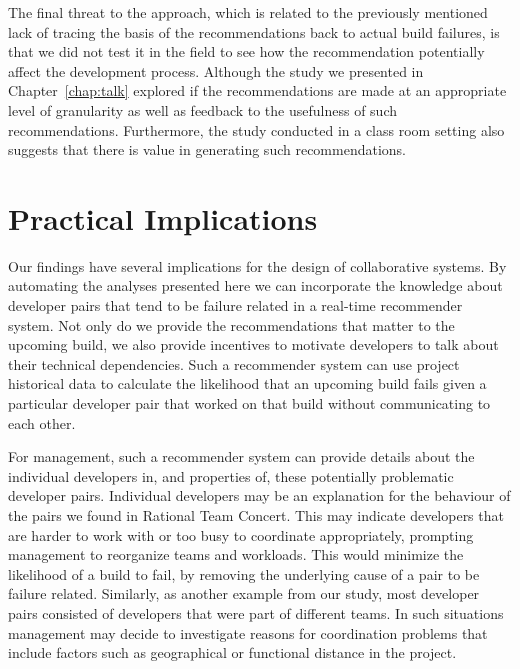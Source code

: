 The final threat to the approach, which is related to the previously mentioned lack of tracing the basis of the recommendations back to actual build failures, is that we did not test it in the field to see how the recommendation potentially affect the development process.
Although the study we presented in Chapter~\ref{chap:talk} explored if the recommendations are made at an appropriate level of granularity as well as feedback to the usefulness of such recommendations.
Furthermore, the study conducted in a class room setting also suggests that there is value in generating such recommendations.

\section{Practical Implications}
\label{sec:implications}
Our findings have several implications for the design of collaborative systems.
By automating the analyses presented here we can incorporate the knowledge about
developer pairs that tend to be failure related in a real-time recommender
system. Not only do we provide the recommendations that matter to the upcoming
build, we also provide incentives to motivate developers to talk about their
technical dependencies. 
%
Such a recommender system can use project historical data to
calculate the likelihood that an upcoming build fails given a particular
developer pair that worked on that build without communicating to each other.

For management, such a recommender system can provide details about the
individual developers in, and properties of, these potentially problematic
developer pairs. Individual developers may be an explanation for the behaviour of
the pairs we found in Rational Team Concert. This may indicate developers that are
harder to work with or too busy to coordinate appropriately, prompting management
to reorganize teams and workloads. This would minimize the likelihood of a build
to fail, by removing the underlying cause of a pair to be failure related.
Similarly, as another example from our study, most developer pairs
consisted of developers that were part of different teams. In such
situations management may decide to investigate reasons for coordination
problems that include factors such as geographical or functional distance in the project.




